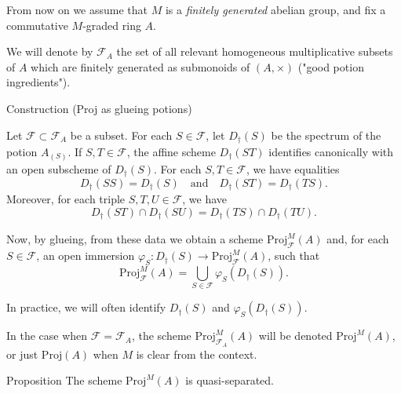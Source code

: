 \documentclass[9pt]{beamer}
\begin{document}
\begin{frame}


From now on we assume that $M$ is a \emph{finitely generated} abelian group, and fix a commutative $M$-graded ring $A$.

We will denote by $\mathcal{F}_A$ the set of all relevant homogeneous multiplicative subsets of $A$ which are finitely generated as submonoids of $(A,\times)$ ("good potion ingredients").

\begin{block}{Construction (Proj as glueing potions)}

Let
$\mathcal{F} \subset \mathcal{F}_A$ be a subset.
 For each $S \in \mathcal{F}$, let $D_{\dagger}(S)$ be the spectrum of the potion $A_{(S)}$. 
 If $S,T \in \mathcal{F}$, the affine scheme $D_{\dagger}(ST)$ identifies canonically with an open subscheme of $D_{\dagger}(S)$. For each $S,T \in \mathcal{F}$, we have equalities
 \[
 D_{\dagger}({S S}) = D_{\dagger}(S) \quad \text{and} \quad D_{\dagger}({ST})=D_{\dagger}({TS}).
 \]
 Moreover, for each triple $S,T,U \in \mathcal{F}$, we have
 \[
 D_{\dagger}({ST} )\cap D_{\dagger}({SU}) = D_{\dagger}({TS}) \cap D_{\dagger}({TU}).
 \]

Now, by glueing, from these data we obtain a scheme $\mathrm{Proj}^M_{\mathcal{F} } (A)$ and, for each $S \in \mathcal{F}$, an open immersion $\varphi_S : D_{\dagger}(S) \to \mathrm{Proj}^M_{\mathcal{F}} (A)$, such that
\[
\mathrm{Proj}^M_{\mathcal{F} } (A) = \bigcup_{S \in \mathcal{F} } \varphi_S( D_{\dagger}(S)).
\]

In practice, we will often identify $D_{\dagger}(S) $ and $\varphi_S (D_{\dagger}(S))$. 


In the case when $\mathcal{F} = \mathcal{F}_A$,
 the scheme $\mathrm{Proj}^M_{\mathcal{F}_A} (A)$ will be denoted $\mathrm{Proj}^M(A)$, or just $\mathrm{Proj}( A)$ when $M$ is clear from the context.
 \end{block}

 \end{frame}




\begin{frame}

\begin{block}{Proposition} 
The scheme $\mathrm{Proj}^M(A)$ is quasi-separated.
\end{block}

\end{frame}
\end{document}
